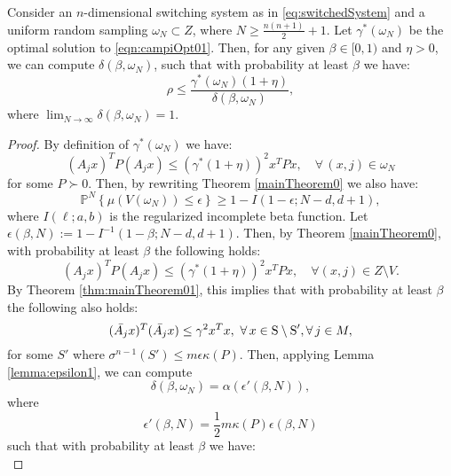 
\begin{theorem}\label{thm:mainTheorem}Consider an $n$-dimensional switching system as in \eqref{eq:switchedSystem} and a uniform random sampling $\omega_N \subset Z$, where $N \geq \frac{n(n+1)}{2}+1$. Let $\gamma^*(\omega_N) $ be the optimal solution to \eqref{eqn:campiOpt01}. Then, for any given $\beta \in [0,1)$ and $\eta > 0$, we can compute $\delta(\beta, \omega_N)$, such that with probability at least $\beta$ we have:
$$\rho \leq \frac{\gamma^*(\omega_N) (1+ \eta)}{\delta(\beta, \omega_N)},$$
where $\lim_{N \to \infty}\delta(\beta, \omega_N) = 1$.
\end{theorem}

\begin{proof}
By definition of $\gamma^*(\omega_N)$ we have:
\begin{equation*} (A_j x)^TP(A_j x) \leq {(\gamma^*(1+\eta))}^2 x^TPx, \quad \forall\, (x, j)  \in \omega_N \end{equation*}
for some $P \succ 0$. 
Then, by rewriting Theorem \ref{mainTheorem0} we also have:
\begin{equation}\label{eqn:violation2}\mathbb{P}^N\left\{ \mu(V(\omega_N)) \leq \epsilon \right\} \geq 1- I(1-\epsilon; N-d, d+1),\end{equation}
where $I(\ell;a,b)$ is the regularized incomplete beta function. Let $\epsilon(\beta, N):=1- I^{-1}(1-\beta; N-d, d+1)$. 
Then, by Theorem \ref{mainTheorem0}, with probability at least $\beta$ the following holds:
\begin{equation*} (A_jx)^TP(A_jx) \leq  {(\gamma^*(1+\eta))}^2 x^TPx, \quad \forall (x, j) \in Z \setminus V.\end{equation*}
By Theorem \ref{thm:mainTheorem01}, this implies that with probability at least $\beta$ the following also holds:
\begin{equation*}(\bar{A_j} x)^T(\bar{A_j} x) \leq {\gamma}^2x^Tx,\,\, \forall\, x \in \text{S} \setminus \text{S}', \forall\, j \in M,\end{equation*}
for some $S'$ where $\sigma^{n-1}(S') \leq m\epsilon \kappa(P)$. Then, applying Lemma \ref{lemma:epsilon1}, we can compute
$$\delta(\beta, \omega_N) =\alpha(\epsilon'(\beta,N)),$$
where
\begin{equation}\label{eqn:eps2}\epsilon'(\beta, N) = \frac{1}{2} m\kappa(P)\epsilon(\beta,N)\end{equation} such that with probability at least $\beta$ we have:
\begin{equation*}

\end{equation*}
\end{proof}
